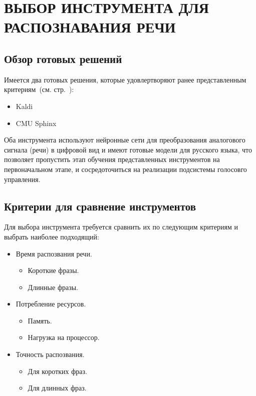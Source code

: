 \chapter{ВЫБОР ИНСТРУМЕНТА ДЛЯ РАСПОЗНАВАНИЯ РЕЧИ}

\section{Обзор готовых решений}

Имеется два готовых решения, которые удовлертворяют ранее представленным
критериям~(см. стр.~\pageref{enum:asr:cond}):
\begin{itemize}
    \item Kaldi
    \item CMU Sphinx
\end{itemize}

Оба инструмента используют нейронные сети для преобразования аналогового сигнала
(речи) в цифровой вид и имеют готовые модели для русского языка, что позволяет
пропустить этап обучения представленных инструментов на первоначальном этапе, и
сосредоточиться на реализации подсистемы голосовго управления.

\section{Критерии для сравнение инструментов}
Для выбора инструмента требуется сравнить их по следующим критериям и выбрать
наиболее подходящий:
\begin{itemize}
    \item Время распозвания речи.
    \begin{itemize}
        \item Короткие фразы.
        \item Длинные фразы.
    \end{itemize}
    \item Потребление ресурсов.
    \begin{itemize}
        \item Память.
        \item Нагрузка на процессор.
    \end{itemize}
    \item Точность распозвания.
    \begin{itemize}
        \item Для коротких фраз.
        \item Для длинных фраз.
    \end{itemize}
\end{itemize}

